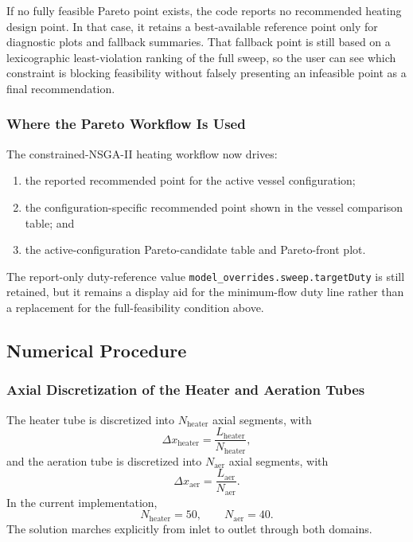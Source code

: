 \documentclass{article}
\begin{document}
If no fully feasible Pareto point exists, the code reports no recommended
heating design point. In that case, it retains a best-available reference
point only for diagnostic plots and fallback summaries. That fallback point is
still based on a lexicographic least-violation ranking of the full sweep, so
the user can see which constraint is blocking feasibility without falsely
presenting an infeasible point as a final recommendation.

\subsubsection{Where the Pareto Workflow Is Used}

The constrained-NSGA-II heating workflow now drives:
\begin{enumerate}
\item the reported recommended point for the active vessel configuration;
\item the configuration-specific recommended point shown in the vessel
      comparison table; and
\item the active-configuration Pareto-candidate table and Pareto-front plot.
\end{enumerate}

The report-only duty-reference value
\texttt{model\_overrides.sweep.targetDuty} is still retained, but it remains a
display aid for the minimum-flow duty line rather than a replacement for the
full-feasibility condition above.

\subsection{Numerical Procedure}

\subsubsection{Axial Discretization of the Heater and Aeration Tubes}

The heater tube is discretized into $N_{\mathrm{heater}}$ axial segments,
with
\begin{equation}
\Delta x_{\mathrm{heater}}
= \frac{L_{\mathrm{heater}}}{N_{\mathrm{heater}}},
\end{equation}
and the aeration tube is discretized into $N_{\mathrm{aer}}$ axial segments,
with
\begin{equation}
\Delta x_{\mathrm{aer}}
= \frac{L_{\mathrm{aer}}}{N_{\mathrm{aer}}}.
\end{equation}
In the current implementation,
\begin{equation}
N_{\mathrm{heater}} = 50,
\qquad
N_{\mathrm{aer}} = 40.
\end{equation}
The solution marches explicitly from inlet to outlet through both domains.
\end{document}
